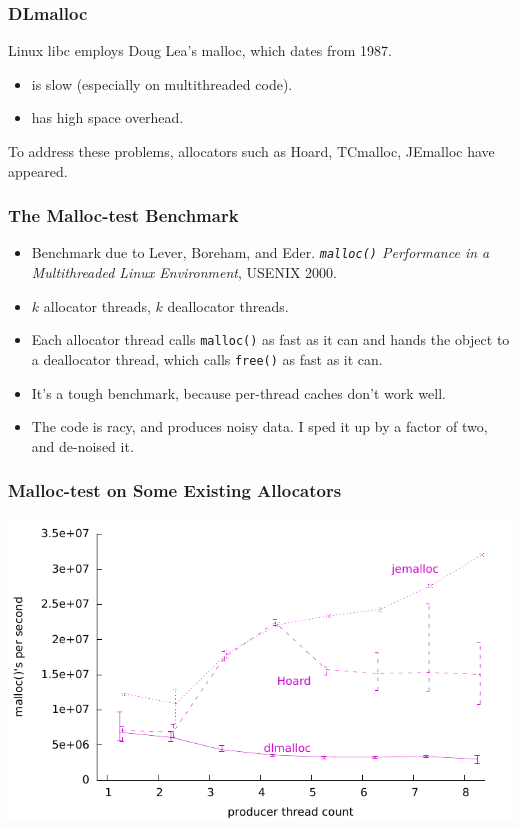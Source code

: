 \documentclass[xcolor=dvipsnames,14pt]{beamer}
\begin{document}
\begin{frame}
\frametitle{DLmalloc}

Linux libc employs Doug Lea's malloc, which dates from 1987.

\begin{itemize}
\item is slow (especially on multithreaded code).
\item has high space overhead.
\end{itemize}

To address these problems, allocators such as Hoard, TCmalloc, JEmalloc have appeared.

\end{frame}

\begin{frame}
\frametitle{The Malloc-test Benchmark}

\begin{itemize}
\item Benchmark due to Lever, Boreham, and Eder.
\textit{\texttt{malloc()} Performance in a Multithreaded Linux
  Environment}, USENIX 2000.

\item $k$ allocator threads, $k$ deallocator threads.

\item Each allocator thread calls \texttt{malloc()} as fast as it can and hands the object to a deallocator thread, which calls \texttt{free()} as fast as it can.

\item It's a tough benchmark, because per-thread caches don't work well.

\item The code is racy, and produces noisy data.  I sped it up by a factor of two, and de-noised it.
\end{itemize}

\end{frame}

\begin{frame}
\frametitle{Malloc-test on Some Existing Allocators}
\hspace*{-.7cm}\includegraphics{new-malloc-test-1K-aggregated-oldallocators.pdf}
\end{frame}
\end{document}

